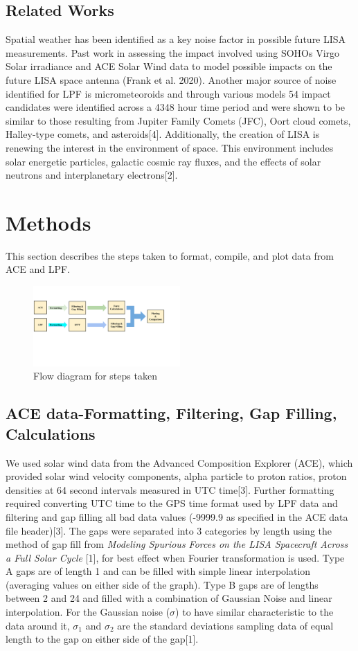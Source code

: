 \documentclass[%
 reprint,
 amsmath,amssymb,
 aps,
]{revtex4-2}
\begin{document}
\subsection{\label{sec:level2}Related Works}
Spatial weather has been identified as a key noise factor in possible future LISA measurements. Past work in assessing the impact involved using SOHOs Virgo Solar irradiance and ACE Solar Wind data to model possible impacts on the future LISA space antenna (Frank et al. 2020).
Another major source of noise identified for LPF is micrometeoroids and through various models 54 impact candidates were identified across a 4348 hour time period and were shown to be similar to those resulting from Jupiter Family Comets (JFC), Oort cloud comets, Halley-type comets, and asteroids[4].
Additionally, the creation of LISA is renewing the interest in the environment of space. This environment includes solar energetic particles, galactic cosmic ray fluxes, and the effects of solar neutrons and interplanetary electrons[2].

\section{Methods}
This section describes the steps taken to format, compile, and plot data from ACE and LPF.
\begin{figure}[htbp]
\centerline{\includegraphics[width=0.5\textwidth]{fig1solWmam.jpg}}
\caption{Flow diagram for steps taken}
\label{fig}
\end{figure}
\subsection{ACE data-Formatting, Filtering, Gap Filling, Calculations
}
We used solar wind data from the Advanced Composition Explorer (ACE), which provided solar wind velocity components, alpha particle to proton ratios, proton densities at 64 second intervals measured in UTC time[3]. Further formatting required converting UTC time to the GPS time format used by LPF data and filtering and gap filling all bad data values (-9999.9 as specified in the ACE data file header)[3]. The gaps were separated into 3 categories by length using the method of gap fill from \textit{Modeling Spurious Forces on the LISA Spacecraft Across a Full Solar Cycle} [1], for best effect when Fourier transformation is used. Type A gaps are of length 1 and can be filled with simple linear interpolation  (averaging values on either side of the graph). Type B gaps are of lengths between 2 and 24 and filled with a combination of Gaussian Noise and linear interpolation. For the Gaussian noise (\(\sigma\)) to have similar characteristic to the data around it, \(\sigma_{1}\) and \(\sigma_{2}\) are the standard deviations sampling data of equal length to the gap on either side of the gap[1].
\end{document}
